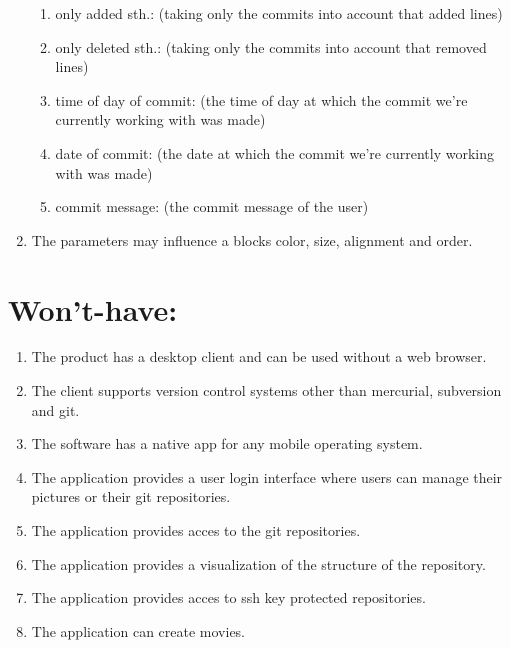 \documentclass[12pt]{scrartcl}
\begin{document}
\begin{enumerate}
\begin{enumerate}
\item only added sth.:
(taking only the commits into account that added lines)
\item only deleted sth.:
(taking only the commits into account that removed lines)
\item time of day of commit:
(the time of day at which the commit we're currently working with was made)
\item date of commit:
(the date at which the commit we're currently working with was made)
\item commit message:
(the commit message of the user)
\end{enumerate}
\item The parameters may influence a blocks color, size, alignment and order.
\end{enumerate}
\newpage
\section{Won't-have:}
\begin{enumerate}
\item The product has a desktop client and can be used without a web browser.
\item The client supports version control systems other than mercurial, subversion and git.
\item The software has a native app for any mobile operating system.
\item The application provides a user login interface where users can manage their pictures or their git repositories.
\item The application provides acces to the git repositories.
\item The application provides a visualization of the structure of the repository.
\item The application provides acces to ssh key protected repositories.
\item The application can create movies.
\end{enumerate}
\end{document}
